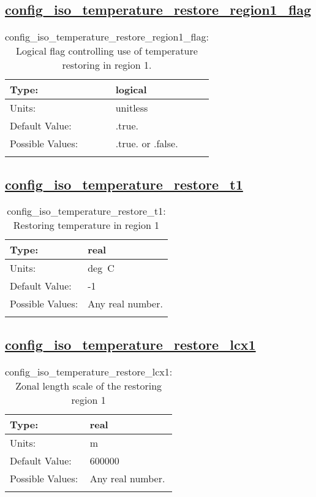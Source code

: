 \subsection[config\_iso\_temperature\_restore\_region1\_flag]{\hyperref[sec:nm_tab_iso]{config\_iso\_temperature\_restore\_region1\_flag}}
\label{subsec:nm_sec_config_iso_temperature_restore_region1_flag}
\begin{center}
\begin{longtable}{| p{2.0in} || p{4.0in} |}
    \hline
    Type: & logical \\
    \hline
    Units: & \si{unitless} \\
    \hline
    Default Value: & .true. \\
    \hline
    Possible Values: & .true. or .false. \\
    \hline
    \caption{config\_iso\_temperature\_restore\_region1\_flag: Logical flag controlling use of temperature restoring in region 1.}
\end{longtable}
\end{center}
\subsection[config\_iso\_temperature\_restore\_t1]{\hyperref[sec:nm_tab_iso]{config\_iso\_temperature\_restore\_t1}}
\label{subsec:nm_sec_config_iso_temperature_restore_t1}
\begin{center}
\begin{longtable}{| p{2.0in} || p{4.0in} |}
    \hline
    Type: & real \\
    \hline
    Units: & \si{deg.C} \\
    \hline
    Default Value: & -1 \\
    \hline
    Possible Values: & Any real number. \\
    \hline
    \caption{config\_iso\_temperature\_restore\_t1: Restoring temperature in region 1}
\end{longtable}
\end{center}
\subsection[config\_iso\_temperature\_restore\_lcx1]{\hyperref[sec:nm_tab_iso]{config\_iso\_temperature\_restore\_lcx1}}
\label{subsec:nm_sec_config_iso_temperature_restore_lcx1}
\begin{center}
\begin{longtable}{| p{2.0in} || p{4.0in} |}
    \hline
    Type: & real \\
    \hline
    Units: & \si{m} \\
    \hline
    Default Value: & 600000 \\
    \hline
    Possible Values: & Any real number. \\
    \hline
    \caption{config\_iso\_temperature\_restore\_lcx1: Zonal length scale of the restoring region 1}
\end{longtable}
\end{center}
